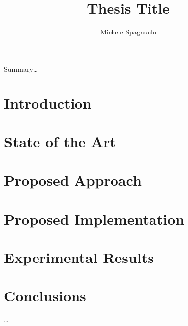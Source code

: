 \documentclass[letterpaper,11pt,oneside,final]{uicthesis}
\title{Thesis Title}
\author{Michele Spagnuolo}
\begin{document}
	\maketitle

	\dedication
		

	\acknowledgements
		

	
	\tableofcontents
	\listoftables
	\listoffigures
		\glsaddall
		\printglossary[title=LIST OF ABBREVIATIONS]

	\summary \label{summary}
		Summary\ldots

	\chapter{Introduction} \label{chap:intro}
		
	\chapter{State of the Art} \label{chap:SOA}
		
	\chapter{Proposed Approach} \label{chap:approach}
		
	\chapter{Proposed Implementation} \label{chap:implem}
		
	\chapter{Experimental Results} \label{chap:results}
		
	\chapter{Conclusions} \label{chap:conclusion}
		

	\clearpage
	\appendices
		\appendix \label{app:a}
		

	\clearpage
	\bib
	
	\nocite{*}

	\newpage

	
		\ldots
\end{document}
